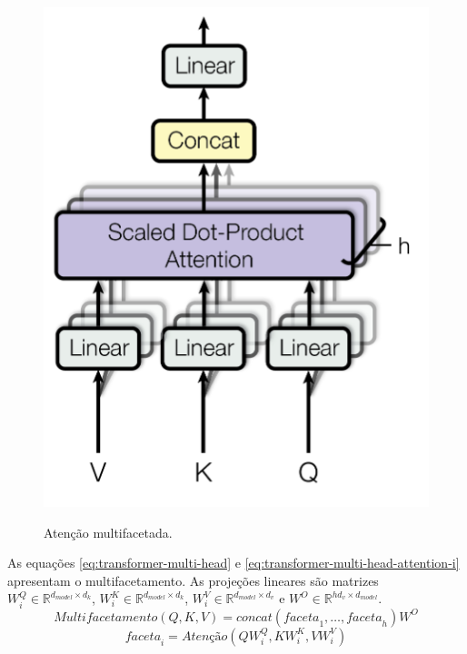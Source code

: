 \begin{figure}[htbp]
    \centering
        \caption{Atenção multifacetada.}
        \includegraphics[scale=0.85]{resources/images/pln/transformer-atencao-multifacetada.png}
        \label{fig:transformer-atencao-multifacetada}
\end{figure}

As equações \ref{eq:transformer-multi-head} e \ref{eq:transformer-multi-head-attention-i} apresentam o multifacetamento. As projeções lineares são matrizes $W_i^Q \in \mathbb{R}^{d_{model} \times d_k}$, $W_i^K \in \mathbb{R}^{d_{model} \times d_k}$, $W_i^V \in \mathbb{R}^{d_{model} \times d_v}$ e $W^O \in \mathbb{R}^{hd_v \times d_{model}}$.
\begin{equation}
    \label{eq:transformer-multi-head}
    \textit{Multifacetamento}(Q, K, V) = concat(\textit{faceta}_1, \dots, \textit{faceta}_h)W^O
\end{equation}
\begin{equation}
    \label{eq:transformer-multi-head-attention-i}
    \textit{faceta}_i = \textit{Atenção}(QW_i^Q, KW_i^K, VW_i^V)
\end{equation}

